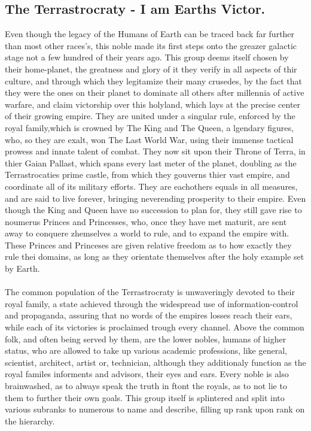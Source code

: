 \documentclass[a4paper,12pt]{book}
\begin{document}
\subsection{The Terrastrocraty -  I am Earths Victor.}
Even though the legacy of the Humans of Earth can be traced back far further than most other races's, this noble made its first steps onto the greazer galactic stage not a few hundred of their years ago. This group deems itself chosen by their home-planet, the greatness and glory of it they verify in all aspects of thir culture, and through which they legitamize their many crusedes, by the fact that they were the ones on their planet to dominate all others after millennia of active warfare, and claim victorship over this holyland, which lays at the precise center of their growing empire. They are united under a singular rule, enforced by the royal family,which is crowned by The King and The Queen, a lgendary figures, who, so they are exalt, won The Last World War, using their immense tactical prowess and innate talent of combat. They now sit upon their Throne of Terra, in thier Gaian Pallast, which spans every last meter of the planet, doubling as the Terrastrocaties prime castle, from which they gouverns thier vast empire, and coordinate all of its military efforts. They are eachothers equals in all  measures, and are said to live forever, bringing neverending prosperity to their empire. Even though the King and Queen have no succession to plan for, they still gave rise to noumerus Princes and Princesses, who, once they have met maturit, are sent away to conquere zhemselves a world to rule, and to expand the empire with. These Princes and Princeses are given relative freedom as to how exactly they rule thei domains, as long as they orientate themselves after the holy example set by Earth. \\
\\
The common population of the Terrastrocraty is unwaveringly devoted to their royal family, a state achieved through the widespread use of information-control and propaganda, assuring that no words of the empires losses reach their ears, while each of its victories is proclaimed trough every channel. Above the common folk, and often being served by them, are the lower nobles, humans of higher status, who are allowed to take up various academic professions, like general, scientist, architect, artist or, technician, although they additionaly function as the royal familes informents and advisors, their eyes and ears. Every noble is also brainwashed, as to always speak the truth in ftont the royals, as to not lie to them to further their own goals. This group itself is splintered and split into various subranks to numerous to name and describe, filling up rank upon rank on the hierarchy.\\
\end{document}
